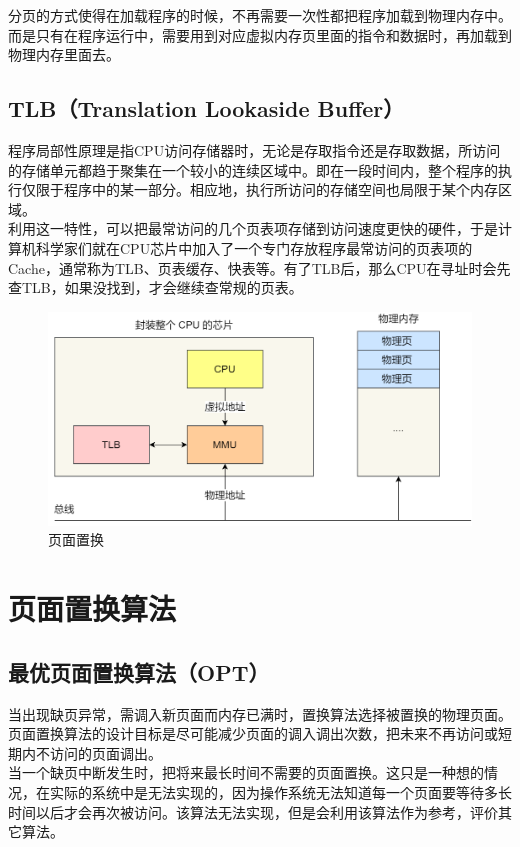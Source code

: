 分页的方式使得在加载程序的时候，不再需要一次性都把程序加载到物理内存中。而是只有在程序运行中，需要用到对应虚拟内存页里面的指令和数据时，再加载到物理内存里面去。

\subsection{TLB（Translation Lookaside Buffer）}

程序局部性原理是指CPU访问存储器时，无论是存取指令还是存取数据，所访问的存储单元都趋于聚集在一个较小的连续区域中。即在一段时间内，整个程序的执行仅限于程序中的某一部分。相应地，执行所访问的存储空间也局限于某个内存区域。 \\

利用这一特性，可以把最常访问的几个页表项存储到访问速度更快的硬件，于是计算机科学家们就在CPU芯片中加入了一个专门存放程序最常访问的页表项的Cache，通常称为TLB、页表缓存、快表等。有了TLB后，那么CPU在寻址时会先查TLB，如果没找到，才会继续查常规的页表。

\begin{figure}[H]
	\centering
	\includegraphics[scale=0.4]{img/C3/3-5/4.png}
	\caption{页面置换}
\end{figure}

\newpage


\section{页面置换算法}

\subsection{最优页面置换算法（OPT）}

当出现缺页异常，需调入新页面而内存已满时，置换算法选择被置换的物理页面。页面置换算法的设计目标是尽可能减少页面的调入调出次数，把未来不再访问或短期内不访问的页面调出。 \\

当一个缺页中断发生时，把将来最长时间不需要的页面置换。这只是一种想的情况，在实际的系统中是无法实现的，因为操作系统无法知道每一个页面要等待多长时间以后才会再次被访问。该算法无法实现，但是会利用该算法作为参考，评价其它算法。

